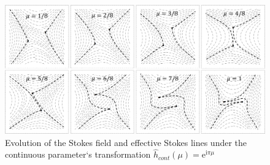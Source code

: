 \documentclass[atmp]{ipart_v1}
\def\rme{\mathrm{e}}
\def\rmi{\mathrm{i}}
\def\h{\hat{h}}
\begin{document}
\begin{figure}
\centering
\noindent
\includegraphics[width=\textwidth]{wrs.png}
\caption{Evolution of the Stokes field and effective Stokes lines 
under the continuous parameter`s transformation $\h_{cont}(\mu)=\rme^{\rmi\pi\mu}$}
\label{fig:webrs}
\end{figure} 
\end{document}
